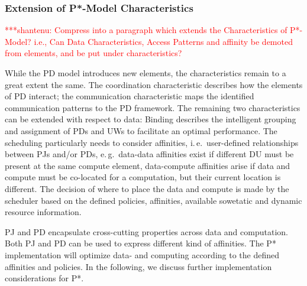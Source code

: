\documentclass[conference,final]{IEEEtran}
\newcommand{\jhanote}[1]{ {\textcolor{red} { ***shantenu: #1 }}}
\newcommand{\alnote}[1]{ {\textcolor{blue} { ***andre: #1 }}}
\newcommand{\alnote}[1]{}
\newcommand{\jhanote}[1]{}
\begin{document}

\subsubsection*{Extension of P*-Model Characteristics}

\jhanote{Compress into a paragraph which extends the Characteristics
  of P*-Model? i.e., Can Data Characteristics, Access Patterns and
  affinity be demoted from elements, and be put under
  characteristics?}

While the PD model introduces new elements, the characteristics remain to a
great extent the same. The coordination characteristic describes how the
elements of PD interact; the communication characteristic maps the identified
communication patterns to the PD framework. The remaining two characteristics
can be extended with respect to data: Binding describes the intelligent grouping
and assignment of PDs and UWs to facilitate an optimal performance. The
scheduling particularly needs to consider affinities, i.\,e.\ user-defined
relationships between PJs and/or PDs, e.\,g.\ data-data affinities exist if
different DU must be present at the same compute element, data-compute
affinities arise if data and compute must be co-located for a computation, but
their current location is different. The decision of where to place the data and
compute is made by the scheduler based on the defined policies, affinities,
available sowetatic and dynamic resource information.


PJ and PD encapsulate cross-cutting properties across data and
computation. Both PJ and PD can be used to express different kind of
affinities.  The P* implementation will optimize data- and computing
according to the defined affinities and policies. In the following, we
discuss further implementation considerations for P*.
\end{document}
